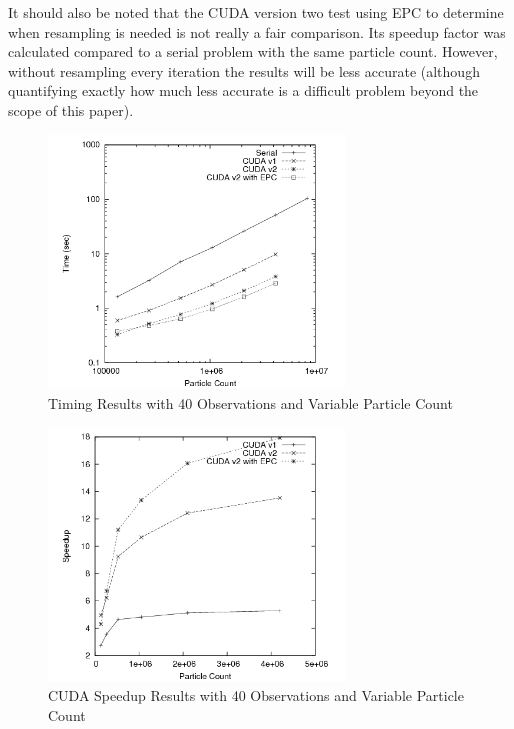 \documentclass{article}
\begin{document}
It should also be noted that the CUDA version two test using EPC to determine when resampling is needed is not really a fair comparison. Its speedup factor was calculated compared to a serial problem with the same particle count. However, without resampling every iteration the results will be less accurate (although quantifying exactly how much less accurate is a difficult problem beyond the scope of this paper).

\begin{figure}
\centering
\includegraphics[width=0.7\textwidth]{data/timing_results.png}
\caption{Timing Results with 40 Observations and Variable Particle Count}
\label{final_timing1}
\end{figure}

\begin{figure}
\centering
\includegraphics[width=0.7\textwidth]{data/timing_results_speedup.png}
\caption{CUDA Speedup Results with 40 Observations and Variable Particle Count}
\label{final_timing2}
\end{figure}
\end{document}
